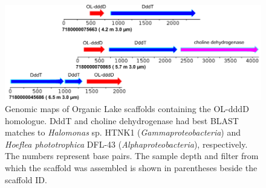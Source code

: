 \begin{figure}
\includegraphics[width=\textwidth]{orglake_figures/OLdddD_scaffolds.pdf}
\caption[Genomic maps of Organic Lake scaffolds containing the OL-dddD homologue]{Genomic maps of Organic Lake scaffolds containing the OL-dddD homologue. DddT and choline dehydrogenase had best \ac{BLAST} matches to \emph{Halomonas} sp. HTNK1 (\emph{Gammaproteobacteria}) and \emph{Hoeflea phototrophica} DFL-43 (\emph{Alphaproteobacteria}), respectively. The numbers represent base pairs. The sample depth and filter from which the scaffold was assembled is shown in parentheses beside the scaffold ID.}
\label{fig:OLdddD_scaffolds}

\end{figure}
